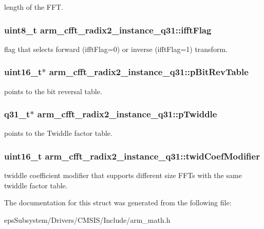 length of the F\-F\-T. \hypertarget{structarm__cfft__radix2__instance__q31_a2607378ce64be16698bb8a3b1af8d3c8}{
\subsubsection[{ifft\-Flag}]{\setlength{\rightskip}{0pt plus 5cm}uint8\-\_\-t arm\-\_\-cfft\-\_\-radix2\-\_\-instance\-\_\-q31\-::ifft\-Flag}}\label{structarm__cfft__radix2__instance__q31_a2607378ce64be16698bb8a3b1af8d3c8}
flag that selects forward (ifft\-Flag=0) or inverse (ifft\-Flag=1) transform. \hypertarget{structarm__cfft__radix2__instance__q31_ada8e5264f4b22ff4c621817978994674}{
\subsubsection[{p\-Bit\-Rev\-Table}]{\setlength{\rightskip}{0pt plus 5cm}uint16\-\_\-t$\ast$ arm\-\_\-cfft\-\_\-radix2\-\_\-instance\-\_\-q31\-::p\-Bit\-Rev\-Table}}\label{structarm__cfft__radix2__instance__q31_ada8e5264f4b22ff4c621817978994674}
points to the bit reversal table. \hypertarget{structarm__cfft__radix2__instance__q31_a1d5bbe9a991e133f81652a77a7985d23}{
\subsubsection[{p\-Twiddle}]{\setlength{\rightskip}{0pt plus 5cm}q31\-\_\-t$\ast$ arm\-\_\-cfft\-\_\-radix2\-\_\-instance\-\_\-q31\-::p\-Twiddle}}\label{structarm__cfft__radix2__instance__q31_a1d5bbe9a991e133f81652a77a7985d23}
points to the Twiddle factor table. \hypertarget{structarm__cfft__radix2__instance__q31_ae63ca9193322cd477970c1d2086407d1}{
\subsubsection[{twid\-Coef\-Modifier}]{\setlength{\rightskip}{0pt plus 5cm}uint16\-\_\-t arm\-\_\-cfft\-\_\-radix2\-\_\-instance\-\_\-q31\-::twid\-Coef\-Modifier}}\label{structarm__cfft__radix2__instance__q31_ae63ca9193322cd477970c1d2086407d1}
twiddle coefficient modifier that supports different size F\-F\-Ts with the same twiddle factor table. 

The documentation for this struct was generated from the following file\-:\begin{DoxyCompactItemize}
\item 
eps\-Subsystem/\-Drivers/\-C\-M\-S\-I\-S/\-Include/arm\-\_\-math.\-h\end{DoxyCompactItemize}
